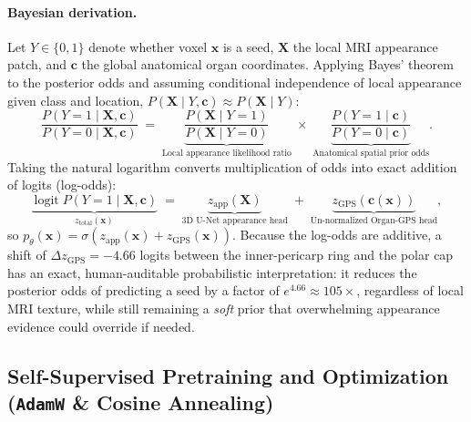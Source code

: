 \documentclass[10pt,a4paper]{article}
\renewcommand{\_}{\origunderscore\allowbreak}
\begin{document}
\paragraph{Bayesian derivation.} Let $Y \in \{0, 1\}$ denote whether voxel $\mathbf{x}$ is a seed, $\mathbf{X}$ the local MRI appearance patch, and $\mathbf{c}$ the global anatomical organ coordinates. Applying Bayes' theorem to the posterior odds and assuming conditional independence of local appearance given class and location, $P(\mathbf{X} \mid Y, \mathbf{c}) \approx P(\mathbf{X} \mid Y)$:
\begin{equation}
    \frac{P(Y = 1 \mid \mathbf{X}, \mathbf{c})}{P(Y = 0 \mid \mathbf{X}, \mathbf{c})}
    \;=\;
    \underbrace{\frac{P(\mathbf{X} \mid Y = 1)}{P(\mathbf{X} \mid Y = 0)}}_{\text{Local appearance likelihood ratio}}
    \;\times\;
    \underbrace{\frac{P(Y = 1 \mid \mathbf{c})}{P(Y = 0 \mid \mathbf{c})}}_{\text{Anatomical spatial prior odds}}.
    \label{eq:bayes_odds}
\end{equation}
Taking the natural logarithm converts multiplication of odds into exact addition of logits (log-odds):
\begin{equation}
    \underbrace{\operatorname{logit} P(Y = 1 \mid \mathbf{X}, \mathbf{c})}_{z_{\text{total}}(\mathbf{x})}
    \;=\;
    \underbrace{z_{\text{app}}(\mathbf{X})}_{\text{3D U-Net appearance head}}
    \;+\;
    \underbrace{z_{\text{GPS}}(\mathbf{c}(\mathbf{x}))}_{\text{Un-normalized Organ-GPS head}},
    \label{eq:bayes_logodds}
\end{equation}
so $p_\theta(\mathbf{x}) = \sigma(z_{\text{app}}(\mathbf{x}) + z_{\text{GPS}}(\mathbf{x}))$. Because the log-odds are additive, a shift of $\Delta z_{\text{GPS}} = -4.66$ logits between the inner-pericarp ring and the polar cap has an exact, human-auditable probabilistic interpretation: it reduces the posterior odds of predicting a seed by a factor of $e^{4.66} \approx 105\times$, regardless of local MRI texture, while still remaining a \emph{soft} prior that overwhelming appearance evidence could override if needed.

\subsection{Self-Supervised Pretraining and Optimization (\texttt{AdamW} \& Cosine Annealing)}
\end{document}
